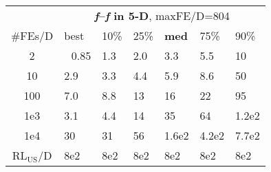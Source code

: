 \begin{tabular}{c|llllll}
 & \multicolumn{6}{|c}{\textbf{\textit{f}\raisebox{-0.35ex}{1}--\textit{f}\raisebox{-0.35ex}{24} in 5-D}, maxFE/D=804}\\
\#FEs/D & best & 10\% & 25\% & \textbf{med} & 75\% & 90\%\\
2 & ~\,0.85 & \hspace*{1ex}1.3 & \hspace*{1ex}2.0 & \hspace*{1ex}3.3 & \hspace*{1ex}5.5 & 10\\
10 & \hspace*{1ex}2.9 & \hspace*{1ex}3.3 & \hspace*{1ex}4.4 & \hspace*{1ex}5.9 & \hspace*{1ex}8.6 & 50\\
100 & \hspace*{1ex}7.0 & \hspace*{1ex}8.8 & 13 & 16 & 22 & 95\\
1e3 & \hspace*{1ex}3.1 & \hspace*{1ex}4.4 & 14 & 35 & 64 & 1.2e2\\
1e4 & 30 & 31 & 56 & 1.6e2 & 4.2e2 & 7.7e2\\
$\text{RL}_{\text{US}}$/D & 8e2 & 8e2 & 8e2 & 8e2 & 8e2 & 8e2
\end{tabular}
